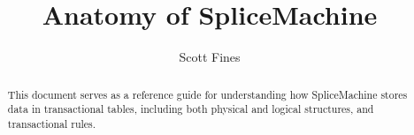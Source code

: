 \documentclass[10pt]{amsbook}
\begin{document}
\title{Anatomy of SpliceMachine}
\author{Scott Fines}

\maketitle

\begin{abstract}
This document serves as a reference guide for understanding how SpliceMachine stores data in transactional tables, including both physical and logical structures, and transactional rules.
\end{abstract}
\end{document}
